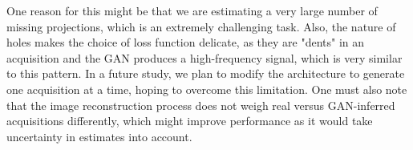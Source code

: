 \documentclass[../main.tex]{subfiles}
\begin{document}
One reason for this might be that we are estimating a very large number of missing projections, which is an extremely challenging task. Also, the nature of holes makes the choice of loss function delicate, as they are "dents" in an acquisition and the GAN produces a high-frequency signal, which is very similar to this pattern. In a future study, we plan to modify the architecture to generate one acquisition at a time, hoping to overcome this limitation. One must also note that the image reconstruction process does not weigh real versus GAN-inferred acquisitions differently, which might improve performance as it would take uncertainty in estimates into account.
\end{document}

